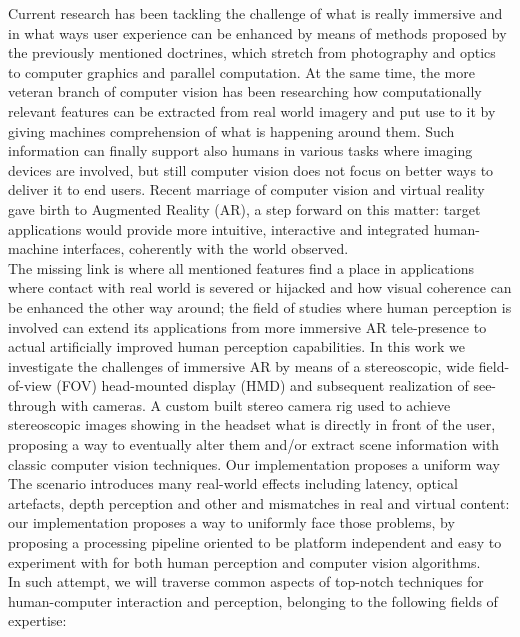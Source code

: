Current research has been tackling the challenge of what is really immersive and in what ways user experience can be enhanced by means of methods proposed by the previously mentioned doctrines, which stretch from photography and optics to computer graphics and parallel computation. At the same time, the more veteran branch of computer vision has been researching how computationally relevant features can be extracted from real world imagery and put use to it by giving machines comprehension of what is happening around them. Such information can finally support also humans in various tasks where imaging devices are involved, but still computer vision does not focus on better ways to deliver it to end users. Recent marriage of computer vision and virtual reality gave birth to Augmented Reality (AR), a step forward on this matter: target applications would provide more intuitive, interactive and integrated human-machine interfaces, coherently with the world observed.\\
The missing link is where all mentioned features find a place in applications where contact with real world is severed or hijacked and how visual coherence can be enhanced the other way around; the field of studies where human perception is involved can extend its applications from more immersive AR tele-presence to actual artificially improved human perception capabilities. In this work we investigate the challenges of immersive AR by means of a stereoscopic, wide field-of-view (FOV) head-mounted display (HMD) and subsequent realization of see-through with cameras. A custom built stereo camera rig used to achieve stereoscopic images showing in the headset what is directly in front of the user, proposing a way to eventually alter them and/or extract scene information with classic computer vision techniques. Our implementation proposes a uniform way The scenario introduces many real-world effects including latency, optical artefacts, depth perception and other and mismatches in real and virtual content: our implementation proposes a way to uniformly face those problems, by proposing a processing pipeline oriented to be platform independent and easy to experiment with for both human perception and computer vision algorithms.\\
In such attempt, we will traverse common aspects of top-notch techniques for human-computer interaction and perception, belonging to the following fields of expertise:
